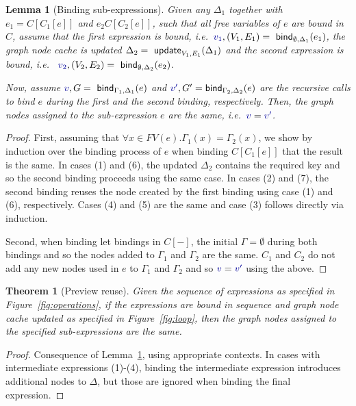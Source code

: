 \documentclass[sigplan,10pt]{acmart}\settopmatter{printfolios=true,printccs=false,printacmref=false}
\newcounter{thc}
\theoremstyle{plain}
\newtheorem{lem}[thc]{Lemma}
\newtheorem{theorem}[thc]{Theorem}
\theoremstyle{definition}
\newcommand{\ident}[1]{\textnormal{\sffamily #1}}
\newcommand{\bndclr}[1]{\textcolor{kvdclr}{#1}}
\begin{document}
\begin{lem}[Binding sub-expressions]
\label{thm:sub-expr}
Given any $\Delta_1$ together with $e_1 = C[C_1[e]]$ and $e_2 C[C_2[e]]$, such that all free 
variables of $e$ are bound in $C$, assume that the first expression is bound,
i.e.~$\bndclr{v_1}, (V_1, E_1) = \ident{bind}_{\emptyset, \Delta_1}(e_1)$, the graph node cache
is updated $\Delta_2 = \ident{update}_{V_1, E_1}(\Delta_1)$ and the second expression is bound, i.e.~
$\bndclr{v_2}, (V_2, E_2) = \ident{bind}_{\emptyset, \Delta_2}(e_2)$. 

Now, assume $\bndclr{v}, G = \ident{bind}_{\Gamma_1, \Delta_1}(e)$ and 
$\bndclr{v'}, G' = \ident{bind}_{\Gamma_2, \Delta_2}(e)$ are the recursive calls to bind
$e$ during the first and the second binding, respectively. Then, the graph nodes assigned to the
sub-expression $e$ are the same, i.e.~$\bndclr{v} = \bndclr{v'}$.
\end{lem}
\begin{proof}
First, assuming that $\forall x\in FV(e). \Gamma_1(x) = \Gamma_2(x)$, we show by induction over the binding process of $e$
when binding $C[C_1[e]]$ that the result is the same. In cases (1) and (6), the updated $\Delta_2$
contains the required key and so the second binding proceeds using the same case. In cases 
(2) and (7), the second binding reuses the node created by the first binding using case (1) and
(6), respectively. Cases (4) and (5) are the same and case (3) follows directly via induction. 

Second, when binding let bindings in $C[-]$, the initial $\Gamma = \emptyset$ during both bindings
and so the nodes added to $\Gamma_1$ and $\Gamma_2$ are the same. $C_1$ and $C_2$ do not add
any new nodes used in $e$ to $\Gamma_1$ and $\Gamma_2$ and so $\bndclr{v} = \bndclr{v'}$
using the above.
\end{proof}

\begin{theorem}[Preview reuse]
Given the sequence of expressions as specified in Figure~\ref{fig:operations}, if the expressions
are bound in sequence and graph node cache updated as specified in Figure~\ref{fig:loop}, then 
the graph nodes assigned to the specified sub-expressions are the same.
\end{theorem}
\begin{proof}
Consequence of Lemma~\ref{thm:sub-expr}, using appropriate contexts. In cases with 
intermediate expressions (1)-(4), binding the intermediate expression introduces additional
nodes to $\Delta$, but those are ignored when binding the final expression.
\end{proof}
  
\end{document}
